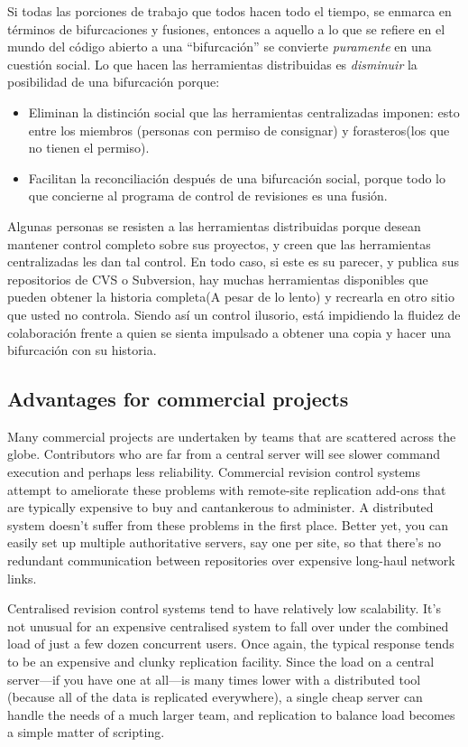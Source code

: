Si todas las porciones de trabajo que todos hacen todo el tiempo, se
enmarca en términos de bifurcaciones y fusiones, entonces a aquello a
lo que se refiere en el mundo del código abierto a una ``bifurcación''
se convierte \emph{puramente} en una cuestión social. Lo que hacen las
herramientas distribuidas es \emph{disminuir} la posibilidad de una
bifurcación porque:
\begin{itemize}
\item Eliminan la distinción social que las herramientas centralizadas
  imponen: esto entre los miembros (personas con permiso de consignar)
  y forasteros(los que no tienen el permiso).
\item Facilitan la reconciliación después de una bifurcación social,
  porque todo lo que concierne al programa de control de revisiones es
  una fusión.
\end{itemize}

Algunas personas se resisten a las herramientas distribuidas porque
desean mantener control completo sobre sus proyectos, y creen que las
herramientas centralizadas les dan tal control. En todo caso, si este
es su parecer, y publica sus repositorios de CVS o Subversion, hay
muchas herramientas disponibles que pueden obtener la historia
completa(A pesar de lo lento) y recrearla en otro sitio que usted no
controla. Siendo así un control ilusorio, está impidiendo la fluidez
de colaboración frente a quien se sienta impulsado a obtener una copia
y hacer una bifurcación con su historia.

\subsection{Advantages for commercial projects}

Many commercial projects are undertaken by teams that are scattered
across the globe.  Contributors who are far from a central server will
see slower command execution and perhaps less reliability.  Commercial
revision control systems attempt to ameliorate these problems with
remote-site replication add-ons that are typically expensive to buy
and cantankerous to administer.  A distributed system doesn't suffer
from these problems in the first place.  Better yet, you can easily
set up multiple authoritative servers, say one per site, so that
there's no redundant communication between repositories over expensive
long-haul network links.

Centralised revision control systems tend to have relatively low
scalability.  It's not unusual for an expensive centralised system to
fall over under the combined load of just a few dozen concurrent
users.  Once again, the typical response tends to be an expensive and
clunky replication facility.  Since the load on a central server---if
you have one at all---is many times lower with a distributed
tool (because all of the data is replicated everywhere), a single
cheap server can handle the needs of a much larger team, and
replication to balance load becomes a simple matter of scripting.

